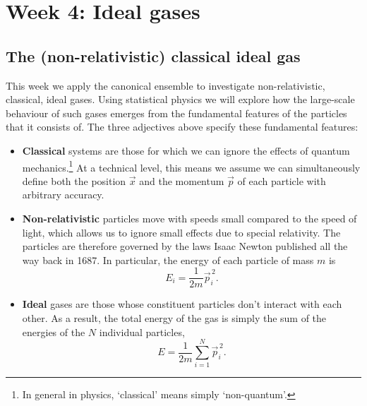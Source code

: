 \renewcommand{\thisweek}{MATH327 Week 4}
\renewcommand{\moddate}{Last modified 3 Feb.~2021}
\setcounter{section}{4}
\setcounter{subsection}{0}
{}
\section*{Week 4: Ideal gases}

\subsection{The (non-relativistic) classical ideal gas}
This week we apply the canonical ensemble to investigate non-relativistic, classical, ideal gases.
Using statistical physics we will explore how the large-scale behaviour of such gases emerges from the fundamental features of the particles that it consists of.
The three adjectives above specify these fundamental features: \\[-24 pt]
\begin{itemize}
  \item \textbf{Classical} systems are those for which we can ignore the effects of quantum mechanics.\footnote{In general in physics, `classical' means simply `non-quantum'.}
        At a technical level, this means we assume we can simultaneously define both the position $\vec x$ and the momentum $\vec p$ of each particle with arbitrary accuracy.
  \item \textbf{Non-relativistic} particles move with speeds small compared to the speed of light, which allows us to ignore small effects due to special relativity.
        The particles are therefore governed by the laws Isaac Newton published all the way back in 1687.
        In particular, the energy of each particle of mass $m$ is
        \begin{equation*}
          E_i = \frac{1}{2m} \vec{p}_i^{\,2}.
        \end{equation*}
  \item \textbf{Ideal} gases are those whose constituent particles don't interact with each other.
        As a result, the total energy of the gas is simply the sum of the energies of the $N$ individual particles,
        \begin{equation}
          E = \frac{1}{2m} \sum_{i = 1}^N \vec{p}_i^{\,2}.
        \end{equation}
\end{itemize}

